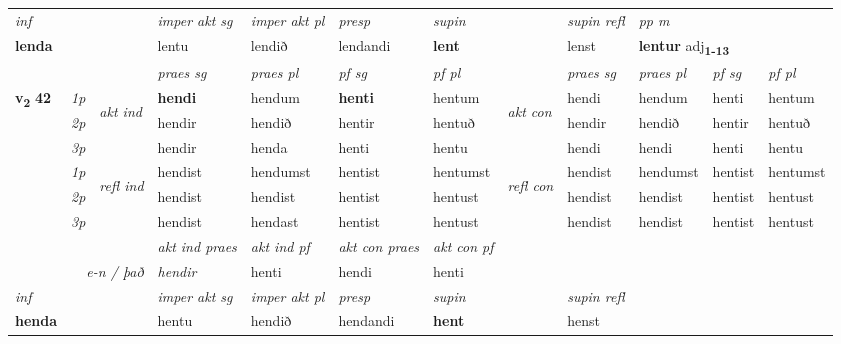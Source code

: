 \begin{longtable}[l]{X>{\footnotesize\itshape}llXXXXlXXXX}
\cmidrule{4-7}
   {\textit{inf}} & &  & \textit{imper akt sg} & \textit{imper akt pl}   & \textit{presp} & \textit{supin} && \textit{supin refl} & \textit{pp m} \\*
  {\textbf{lenda}} & && lentu  & lendið   & lendandi &  \textbf{lent} && lenst & \multicolumn{2}{l}{\textbf{lentur} adj\textbf{\textsubscript{1-13}}} \\*

\midrule

 & &   & \textit{praes sg}  & \textit{praes pl}    & \textit{ pf sg} & \textit{pf pl} & & \textit{praes sg}  & \textit{praes pl}    & \textit{pf sg} & \textit{pf pl }  \\ \cmidrule{4-7} \cmidrule{9-12}
 \multirow{2}{*}{{{\textbf{v{\textsubscript{2}}} \Large{\textbf{42}}}}}  & 1p & \multirow{3}{*}{\begin{turn}{90}\textit{akt ind}\end{turn}} & \textbf{hendi} & hendum & \textbf{henti} & hentum & \multirow{3}{*}{\begin{turn}{90}\textit{akt con}\end{turn}} &hendi & hendum & henti & hentum\\*
 & 2p &  &  hendir  & hendið & hentir & hentuð & & hendir & hendið & hentir & hentuð \\*
 & 3p &  & hendir & henda & henti & hentu & & hendi & hendi& henti & hentu \\*
\cmidrule{4-7} \cmidrule{9-12}
 & 1p & \multirow{3}{*}{\begin{turn}{90}\textit{refl ind}\end{turn}}  & hendist & hendumst & hentist & hentumst & \multirow{3}{*}{\begin{turn}{90}\textit{refl con}\end{turn}}  &hendist & hendumst & hentist & hentumst \\*
 & 2p &  & hendist & hendist & hentist & hentust & &hendist & hendist & hentist & hentust \\*
 & 3p  & & hendist & hendast & hentist & hentust & & hendist & hendist& hentist & hentust \\*
\cmidrule{4-7} \cmidrule{9-12}

   && &  \textit{akt ind praes} & \textit{akt ind pf} & \textit{akt con praes} & \textit{akt con pf} \\*
\multicolumn{3}{r}{\textit{e-n / það}} & hendir & henti & hendi & henti \\*

\cmidrule{4-7}
   {\textit{inf}} & &  & \textit{imper akt sg} & \textit{imper akt pl}   & \textit{presp} & \textit{supin} && \textit{supin refl}  \\*
  {\textbf{henda}} & && hentu  & hendið   & hendandi &  \textbf{hent} && henst  \\*


\end{longtable}
